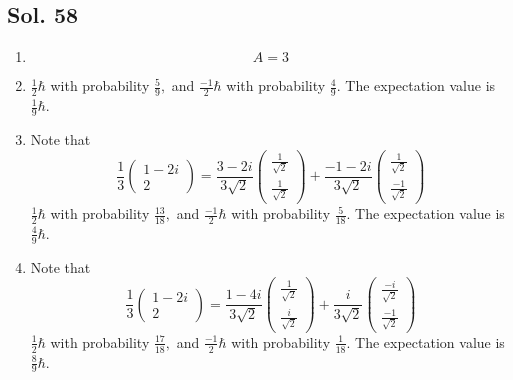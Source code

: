         \subsection*{Sol. 58}
        \begin{enumerate}
            \item 
            $$
            A = 3
            $$
            \item 
            $
            \frac{1}{2}\hbar 
            $
            with probability $\frac{5}{9},$ and 
            $
            \frac{-1}{2}\hbar 
            $
            with probability $\frac{4}{9}.$
            The expectation value is $\frac{1}{9}\hbar.$
            \item 
            Note that 
            $$
            \frac{1}{3}
            \begin{pmatrix}
                1-2i\\
                2
            \end{pmatrix}
            =
            \frac{3-2i}{3\sqrt{2}}
            \begin{pmatrix}
                \frac{1}{\sqrt{2}}\\
                \frac{1}{\sqrt{2}}
            \end{pmatrix}
            +
            \frac{-1-2i}{3\sqrt{2}}
            \begin{pmatrix}
                \frac{1}{\sqrt{2}}\\
                \frac{-1}{\sqrt{2}}
            \end{pmatrix}
            $$
            $
            \frac{1}{2}\hbar 
            $
            with probability $\frac{13}{18},$ and 
            $
            \frac{-1}{2}\hbar 
            $
            with probability $\frac{5}{18}.$
            The expectation value is $\frac{4}{9}\hbar.$
            \item 
            Note that 
            $$
            \frac{1}{3}
            \begin{pmatrix}
                1-2i\\
                2
            \end{pmatrix}
            =
            \frac{1-4i}{3\sqrt{2}}
            \begin{pmatrix}
                \frac{1}{\sqrt{2}}\\
                \frac{i}{\sqrt{2}}
            \end{pmatrix}
            +
            \frac{i}{3\sqrt{2}}
            \begin{pmatrix}
                \frac{-i}{\sqrt{2}}\\
                \frac{-1}{\sqrt{2}}
            \end{pmatrix}
            $$
            $
            \frac{1}{2}\hbar 
            $
            with probability $\frac{17}{18},$ and 
            $
            \frac{-1}{2}\hbar 
            $
            with probability $\frac{1}{18}.$
            The expectation value is $\frac{8}{9}\hbar.$
        \end{enumerate}

